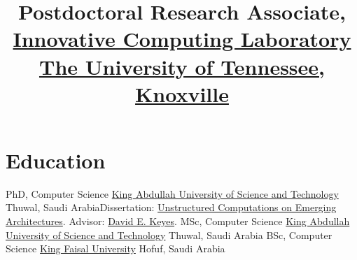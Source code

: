 \documentclass[10pt,a4paper]{moderncv}
\title{\normalsize
  Postdoctoral Research Associate,
  \href{http://www.icl.utk.edu/}{Innovative Computing Laboratory}\newline
  \href{https://www.utk.edu/}{The University of Tennessee, Knoxville}
}
\begin{document}
\makecvtitle
\vspace*{-10mm}
\section{Education}
{%
  {%
    {PhD, Computer Science}
    {\href{https://www.kaust.edu.sa/en}
    {King Abdullah University of Science and Technology}}
    {Thuwal, Saudi Arabia}{}{Dissertation:
    \href{https://repository.kaust.edu.sa/handle/10754/644902}
    {Unstructured Computations on Emerging Architectures}.
    Advisor:
    \href{https://www.kaust.edu.sa/en/study/faculty/david-keyes}
    {David E. Keyes}.}
  }
  {%
    {MSc, Computer Science}
    {\href{https://www.kaust.edu.sa/en}
    {King Abdullah University of Science and Technology}}
    {Thuwal, Saudi Arabia}{}{}
  }
  {%
    {BSc, Computer Science}
    {\href{https://www.kfu.edu.sa/sites/Home/Default.aspx}
    {King Faisal University}}
    {Hofuf, Saudi Arabia}{}{}
  }
}
\end{document}
